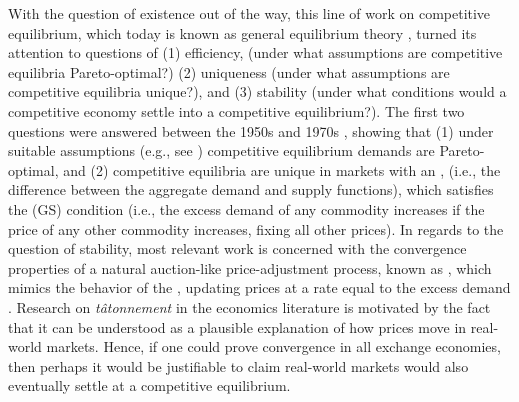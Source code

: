 With the question of existence out of the way, this line of work on competitive equilibrium, which today is known as general equilibrium theory \cite{mckenzie2005classical}, turned its attention to questions of (1) efficiency, (under what assumptions are competitive equilibria Pareto-optimal?) (2) uniqueness (under what assumptions are competitive equilibria unique?), and (3) stability (under what conditions would a competitive economy settle into a competitive equilibrium?).
The first two questions were answered between the 1950s and 1970s \cite{arrow1951extension, arrow1958note, arrow-hurwicz, balasko1975some, debreu1951pareto, dierker1982unique, hahn1958gross, pearce193unique}, showing that (1) under suitable assumptions (e.g., see \citet{arrow-welfare}) competitive equilibrium demands are Pareto-optimal, and (2) competitive equilibria are unique in markets with an , (i.e., the difference between the aggregate demand and supply functions), which satisfies the  (GS) condition (i.e., the excess demand of any commodity increases if the price of any other commodity increases, fixing all other prices).
In regards to the question of stability, most relevant work is concerned with the convergence properties of a natural auction-like price-adjustment process, known as , which mimics the behavior of the , updating prices at a rate equal to the excess demand \cite{arrow1971general, kaldor1934classificatory}.
Research on \emph{t\^atonnement\/} in the economics literature is motivated by the fact that it can be understood as a plausible explanation of how prices move in real-world markets.
Hence, if one could prove convergence in all exchange economies, then perhaps it would be justifiable to claim real-world markets would also eventually settle at a competitive equilibrium.


